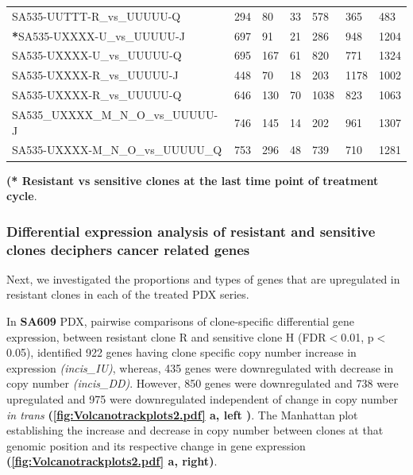 \begin{landscape}
\begin{table}
{\begin{tabular}{|l|p{3.8em}|p{3.8em}|p{3.8em}|p{3.8em}|p{3.8em}|p{3.8em}|}
SA535-UUTTT-R\_vs\_UUUUU-Q         & 294 & 80  & 33  & 578  & 365  & 483  \\
\textbf{*}SA535-UXXXX-U\_vs\_UUUUU-J         & 697 & 91  & 21  & 286  & 948  & 1204 \\
SA535-UXXXX-U\_vs\_UUUUU-Q         & 695 & 167 & 61  & 820  & 771  & 1324 \\
SA535-UXXXX-R\_vs\_UUUUU-J         & 448 & 70  & 18  & 203  & 1178 & 1002 \\
SA535-UXXXX-R\_vs\_UUUUU-Q         & 646 & 130 & 70  & 1038 & 823  & 1063 \\
SA535\_UXXXX\_M\_N\_O\_vs\_UUUUU-J & 746 & 145 & 14  & 202  & 961  & 1307 \\
SA535-UXXXX-M\_N\_O\_vs\_UUUUU\_Q  & 753 & 296 & 48  & 739  & 710  & 1281 \\
  \hline

\end{tabular}
}

\label{tab:numberofDEgenesincistrans}

  \small\textbf{(* Resistant vs sensitive clones at the last time point of treatment cycle}.
\end{table}
\end{landscape}


 \subsubsection{Differential expression analysis of resistant and sensitive clones deciphers cancer related genes}
 Next, we investigated the proportions and types of genes that are upregulated in resistant clones in each of the treated PDX series.
 
 In \textbf{SA609} PDX, pairwise comparisons of clone-specific differential gene expression, between resistant clone R and sensitive clone H (FDR$<$0.01, p$<$0.05), identified 922 genes having clone specific copy number increase in expression \textit{(incis\_IU)}, whereas, 435 genes were downregulated with decrease in copy number \textit{(incis\_DD)}. However, 850 genes were downregulated and 738 were upregulated and 975 were downregulated independent of change in copy number \textit{in trans} \textbf{(\autoref{fig:Volcanotrackplots2.pdf} a, left )}. The Manhattan plot establishing the increase and decrease in copy number between clones at that genomic position and its respective change in gene expression \textbf{(\autoref{fig:Volcanotrackplots2.pdf} a, right)}.
 
